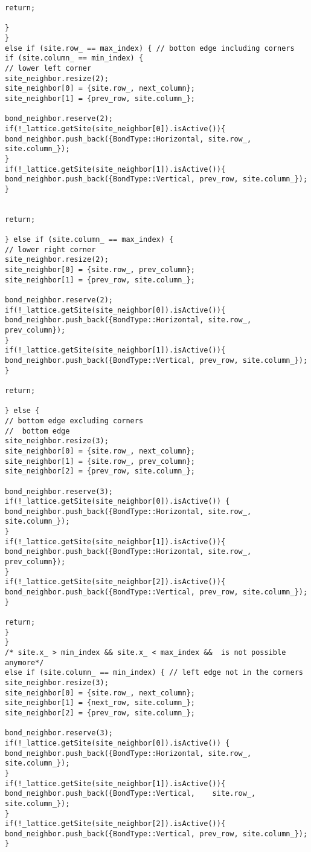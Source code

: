 \begin{lstlisting}[style=CStyle]
return;

}
}
else if (site.row_ == max_index) { // bottom edge including corners
if (site.column_ == min_index) {
// lower left corner
site_neighbor.resize(2);
site_neighbor[0] = {site.row_, next_column};
site_neighbor[1] = {prev_row, site.column_};

bond_neighbor.reserve(2);
if(!_lattice.getSite(site_neighbor[0]).isActive()){
bond_neighbor.push_back({BondType::Horizontal, site.row_, site.column_});
}
if(!_lattice.getSite(site_neighbor[1]).isActive()){
bond_neighbor.push_back({BondType::Vertical, prev_row, site.column_});
}


return;

} else if (site.column_ == max_index) {
// lower right corner
site_neighbor.resize(2);
site_neighbor[0] = {site.row_, prev_column};
site_neighbor[1] = {prev_row, site.column_};

bond_neighbor.reserve(2);
if(!_lattice.getSite(site_neighbor[0]).isActive()){
bond_neighbor.push_back({BondType::Horizontal, site.row_, prev_column});
}
if(!_lattice.getSite(site_neighbor[1]).isActive()){
bond_neighbor.push_back({BondType::Vertical, prev_row, site.column_});
}

return;

} else {
// bottom edge excluding corners
//  bottom edge
site_neighbor.resize(3);
site_neighbor[0] = {site.row_, next_column};
site_neighbor[1] = {site.row_, prev_column};
site_neighbor[2] = {prev_row, site.column_};

bond_neighbor.reserve(3);
if(!_lattice.getSite(site_neighbor[0]).isActive()) {
bond_neighbor.push_back({BondType::Horizontal, site.row_, site.column_});
}
if(!_lattice.getSite(site_neighbor[1]).isActive()){
bond_neighbor.push_back({BondType::Horizontal, site.row_, prev_column});
}
if(!_lattice.getSite(site_neighbor[2]).isActive()){
bond_neighbor.push_back({BondType::Vertical, prev_row, site.column_});
}

return;
}
}
/* site.x_ > min_index && site.x_ < max_index &&  is not possible anymore*/
else if (site.column_ == min_index) { // left edge not in the corners
site_neighbor.resize(3);
site_neighbor[0] = {site.row_, next_column};
site_neighbor[1] = {next_row, site.column_};
site_neighbor[2] = {prev_row, site.column_};

bond_neighbor.reserve(3);
if(!_lattice.getSite(site_neighbor[0]).isActive()) {
bond_neighbor.push_back({BondType::Horizontal, site.row_, site.column_});
}
if(!_lattice.getSite(site_neighbor[1]).isActive()){
bond_neighbor.push_back({BondType::Vertical,    site.row_, site.column_});
}
if(!_lattice.getSite(site_neighbor[2]).isActive()){
bond_neighbor.push_back({BondType::Vertical, prev_row, site.column_});
}


\end{lstlisting}
